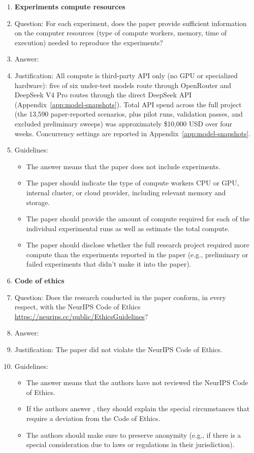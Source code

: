 \documentclass{article}
\begin{document}
\begin{enumerate}
\item {\bf Experiments compute resources}
    \item[] Question: For each experiment, does the paper provide sufficient information on the computer resources (type of compute workers, memory, time of execution) needed to reproduce the experiments?
    \item[] Answer: \answerYes{} %
    \item[] Justification: All compute is third-party API only (no GPU or specialized hardware): five of six under-test models route through OpenRouter and DeepSeek V4 Pro routes through the direct DeepSeek API (Appendix~\ref{app:model-snapshots}). Total API spend across the full project (the 13{,}590 paper-reported scenarios, plus pilot runs, validation passes, and excluded preliminary sweeps) was approximately \$10{,}000 USD over four weeks. Concurrency settings are reported in Appendix~\ref{app:model-snapshots}.
    \item[] Guidelines:
    \begin{itemize}
        \item The answer \answerNA{} means that the paper does not include experiments.
        \item The paper should indicate the type of compute workers CPU or GPU, internal cluster, or cloud provider, including relevant memory and storage.
        \item The paper should provide the amount of compute required for each of the individual experimental runs as well as estimate the total compute. 
        \item The paper should disclose whether the full research project required more compute than the experiments reported in the paper (e.g., preliminary or failed experiments that didn't make it into the paper). 
    \end{itemize}
    
\item {\bf Code of ethics}
    \item[] Question: Does the research conducted in the paper conform, in every respect, with the NeurIPS Code of Ethics \url{https://neurips.cc/public/EthicsGuidelines}?
    \item[] Answer: \answerYes{} %
    \item[] Justification: The paper did not violate the NeurIPS Code of Ethics.
    \item[] Guidelines:
    \begin{itemize}
        \item The answer \answerNA{} means that the authors have not reviewed the NeurIPS Code of Ethics.
        \item If the authors answer \answerNo, they should explain the special circumstances that require a deviation from the Code of Ethics.
        \item The authors should make sure to preserve anonymity (e.g., if there is a special consideration due to laws or regulations in their jurisdiction).
    \end{itemize}



\end{enumerate}
\end{document}
